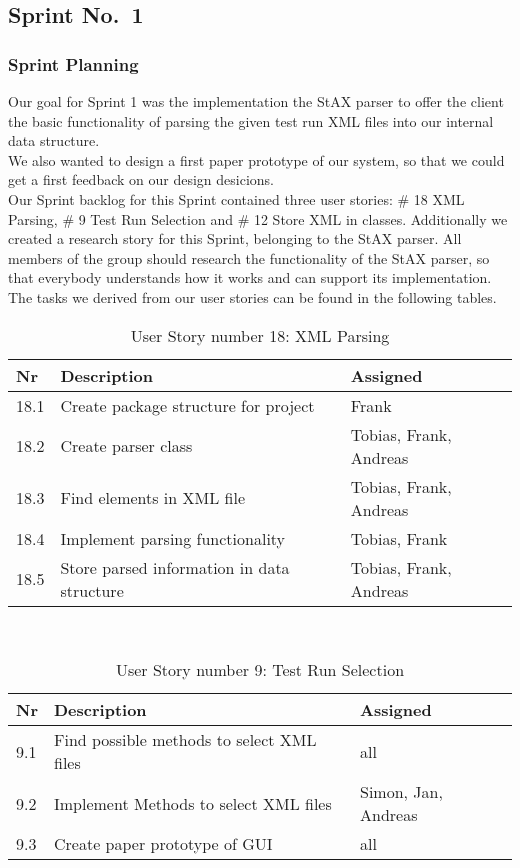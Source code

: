 
\subsection{Sprint No.~1}

\subsubsection*{Sprint Planning}

Our goal for Sprint 1 was the implementation the StAX parser to offer the client the basic functionality of parsing the given test run XML files into our internal data structure. \\ 
We also wanted to design a first paper prototype of our system, so that we could get a first feedback on our design desicions. \\ 
Our Sprint backlog for this Sprint contained three user stories: \# 18 XML Parsing, \# 9 Test Run Selection and \# 12 Store XML in classes. Additionally we created a research story for this Sprint, belonging to the StAX parser. All members of the group should research the functionality of the StAX parser, so that everybody understands how it works and can support its implementation. \\ 
The tasks we derived from our user stories can be found in the following tables. \\ 

\begin{table}[h]
  \caption{User Story number 18: XML Parsing}
  \label{US_Parsing}
  \centering
  \begin{tabular}{p{1cm}|p{5cm}|p{3cm}|}
  	Nr & Description & Assigned \\ 
  	\hline
  	18.1 & Create package structure for project & Frank \\
  	\hline
  	18.2 & Create parser class & Tobias, Frank, Andreas \\ 
  	\hline
  	18.3 & Find elements in XML file & Tobias, Frank, Andreas \\ 
  	\hline
  	18.4 & Implement parsing functionality & Tobias, Frank \\ 
  	\hline
  	18.5 & Store parsed information in data structure & Tobias, Frank, Andreas \\ 
  	\hline
  \end{tabular}
\end{table} 

\ \\

\begin{table}[h]
  \caption{User Story number 9: Test Run Selection}
  \label{US_Selection}
  \centering
  \begin{tabular}{p{1cm}|p{5cm}|p{3cm}|}
  	Nr & Description & Assigned \\ 
  	\hline
  	9.1 & Find possible methods to select XML files & all \\ 
  	\hline
  	9.2 & Implement Methods to select XML files & Simon, Jan, Andreas \\ 
  	\hline
  	9.3 & Create paper prototype of GUI & all \\
  	\hline
  \end{tabular}
\end{table} 

